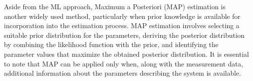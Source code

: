 %
% 
% 
%
Aside from the ML approach, Maximum a Posteriori (MAP) estimation \cite{gauvain1994maximum} is another widely used method, particularly when prior knowledge is available for incorporation into the estimation process. MAP estimation involves selecting a suitable prior distribution for the parameters, deriving the posterior distribution by combining the likelihood function with the prior, and identifying the parameter values that maximize the obtained posterior distribution. It is essential to note that MAP can be applied only when, along with the measurement data, additional information about the parameters describing the system is available.


